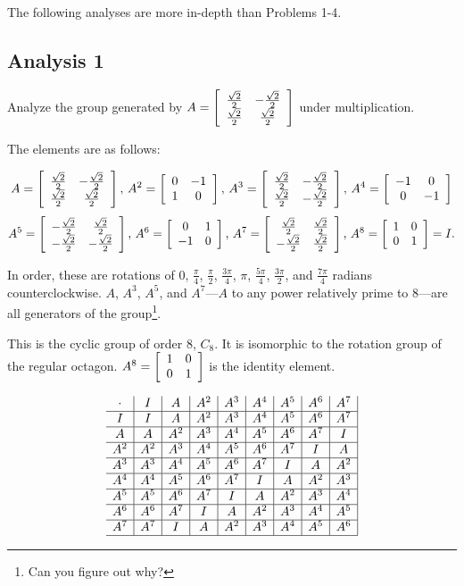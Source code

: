 \documentclass[../gatm.tex]{subfiles}
\begin{document}
The following analyses are more in-depth than Problems 1-4.

\subsection*{Analysis 1}

Analyze the group generated by $A=\left[\begin{array}{cc} \frac{\sqrt{2}}{2} & -\frac{\sqrt{2}}{2} \\ \frac{\sqrt{2}}{2} & \frac{\sqrt{2}}{2} \end{array}\right]$ under multiplication.

The elements are as follows:

$$A= \left[\begin{array}{cc} \frac{\sqrt{2}}{2} & -\frac{\sqrt{2}}{2} \\ \frac{\sqrt{2}}{2} & \frac{\sqrt{2}}{2} \end{array}\right],\,
A^2 = \left[\begin{array}{cc} 0 & -1 \\ 1 & 0 \end{array}\right],\,
A^3 = \left[\begin{array}{cc} \frac{\sqrt{2}}{2} & -\frac{\sqrt{2}}{2} \\ \frac{\sqrt{2}}{2} & -\frac{\sqrt{2}}{2} \end{array}\right],\,
A^4 = \left[\begin{array}{cc} -1 & 0 \\ 0 & -1 \end{array}\right]$$
$$A^5 = \left[\begin{array}{cc} -\frac{\sqrt{2}}{2} & \frac{\sqrt{2}}{2} \\ -\frac{\sqrt{2}}{2} & -\frac{\sqrt{2}}{2} \end{array}\right],\,
A^6 = \left[\begin{array}{cc} 0 & 1 \\ -1 & 0 \end{array}\right],\,
A^7 = \left[\begin{array}{cc} \frac{\sqrt{2}}{2} & \frac{\sqrt{2}}{2} \\ -\frac{\sqrt{2}}{2} & \frac{\sqrt{2}}{2} \end{array}\right],\,
A^8 = \left[\begin{array}{cc} 1 & 0 \\ 0 & 1 \end{array}\right] = I.$$

In order, these are rotations of $0$, $\frac{\pi}{4}$, $\frac{\pi}{2}$, $\frac{3\pi}{4}$, $\pi$, $\frac{5\pi}{4}$, $\frac{3\pi}{2}$, and $\frac{7\pi}{4}$ radians counterclockwise. $A$, $A^3$, $A^5$, and $A^7$---$A$ to any power relatively prime to $8$---are all generators of the group\footnote{Can you figure out why?}.

This is the cyclic group of order $8$, $C_8$. It is isomorphic to the rotation group of the regular octagon. $A^8=\left[\begin{array}{cc} 1 & 0 \\ 0 & 1 \end{array}\right]$ is the identity element.

$$\begin{array}{c|c|c|c|c|c|c|c|c|}
\cdot & I & A & A^2 & A^3 & A^4 & A^5 & A^6 & A^7 \\ \hline
I & I & A & A^2 & A^3 & A^4 & A^5 & A^6 & A^7 \\ \hline
A & A & A^2 & A^3 & A^4 & A^5 & A^6 & A^7 & I \\ \hline
A^2 & A^2 & A^3 & A^4 & A^5 & A^6 & A^7 & I & A \\ \hline
A^3 & A^3 & A^4 & A^5 & A^6 & A^7 & I & A & A^2 \\ \hline
A^4 & A^4 & A^5 & A^6 & A^7 & I & A & A^2 & A^3 \\ \hline
A^5 & A^5 & A^6 & A^7 & I & A & A^2 & A^3 & A^4 \\ \hline
A^6 & A^6 & A^7 & I & A & A^2 & A^3 & A^4 & A^5 \\ \hline
A^7 & A^7 & I & A & A^2 & A^3 & A^4 & A^5 & A^6 \\ \hline
\end{array}$$
\end{document}
